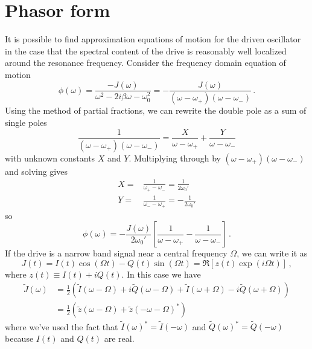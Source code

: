 \documentclass{article}
\begin{document}
\section{Phasor form}

It is possible to find approximation equations of motion for the driven oscillator in the case that the spectral content of the drive is reasonably well localized around the resonance frequency.
Consider the frequency domain equation of motion
\begin{equation}
  \phi(\omega) = \frac{-J(\omega)}{\omega^2 - 2 i \beta \omega - \omega_0^2}
  = - \frac{J(\omega)}{(\omega - \omega_+)(\omega - \omega_-)} \, .
\end{equation}
Using the method of partial fractions, we can rewrite the double pole as a sum of single poles
\begin{equation}
  \frac{1}{(\omega - \omega_+)(\omega - \omega_-)}
  = \frac{X}{\omega - \omega_+} + \frac{Y}{\omega - \omega_-}
\end{equation}
with unknown constants $X$ and $Y$.
Multiplying through by $(\omega - \omega_+)(\omega - \omega_-)$ and solving gives
\begin{align*}
  X =& \frac{1}{\omega_+ - \omega_-} =   \frac{1}{2 \omega_0'} \\
  Y =& \frac{1}{\omega_- - \omega_+} = - \frac{1}{2 \omega_0'}
\end{align*}
so
\begin{equation}
  \phi(\omega) = - \frac{J(\omega)}{2 \omega_0'}
  \left[ \frac{1}{\omega - \omega_+} - \frac{1}{\omega - \omega_-} \right] \, .
\end{equation}
If the drive is a narrow band signal near a central frequency $\Omega$, we can write it as
\begin{equation}
  J(t)
  = I(t) \cos(\Omega t) - Q(t) \sin(\Omega t)
  = \Re \left[ z(t) \exp \left( i \Omega t \right) \right] \, ,
\end{equation}
where $z(t) \equiv I(t) + i Q(t)$.
In this case we have
\begin{align*}
  \tilde{J}(\omega)
  &= \frac{1}{2} \left(
      \tilde{I}(\omega - \Omega) + i \tilde{Q}(\omega - \Omega)
    + \tilde{I}(\omega + \Omega) - i \tilde{Q}(\omega + \Omega)
  \right) \\
  &= \frac{1}{2} \left(
      \tilde{z}(\omega - \Omega) + \tilde{z}(-\omega - \Omega)^*
  \right)
\end{align*}
where we've used the fact that $\tilde{I}(\omega)^* = \tilde{I}(-\omega)$ and $\tilde{Q}(\omega)^* = \tilde{Q}(-\omega)$ because $I(t)$ and $Q(t)$ are real.
\end{document}

